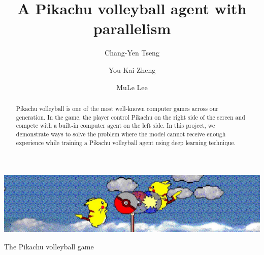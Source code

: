 \documentclass[sigconf]{acmart}
\begin{document}
\title{A Pikachu volleyball agent with parallelism}

\author{Chang-Yen Tseng}

\author{You-Kai Zheng}

\author{MuLe Lee}

\begin{abstract}
  Pikachu volleyball is one of the most well-known computer games across our generation. In the game, the player control Pikachu on the right side of the screen and compete with a built-in computer agent on the left side. In this project, we demonstrate ways to solve the problem where the model cannot receive enough experience while training a Pikachu volleyball agent using deep learning technique.
\end{abstract}


\begin{teaserfigure}
  \includegraphics[width=\textwidth]{teaser}
  \caption{The Pikachu volleyball game}
  \label{fig:teaser}
\end{teaserfigure}

\maketitle
\end{document}
